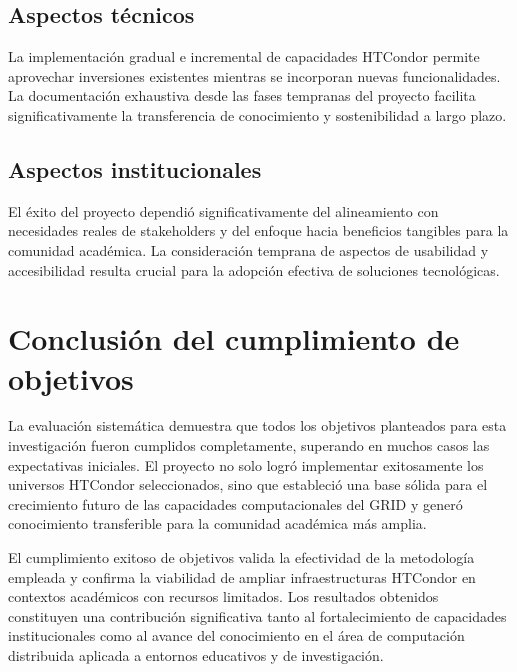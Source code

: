 \subsection{Aspectos técnicos}
\noindent

La implementación gradual e incremental de capacidades HTCondor permite aprovechar inversiones existentes mientras se incorporan nuevas funcionalidades. La documentación exhaustiva desde las fases tempranas del proyecto facilita significativamente la transferencia de conocimiento y sostenibilidad a largo plazo.

\subsection{Aspectos institucionales}
\noindent

El éxito del proyecto dependió significativamente del alineamiento con necesidades reales de stakeholders y del enfoque hacia beneficios tangibles para la comunidad académica. La consideración temprana de aspectos de usabilidad y accesibilidad resulta crucial para la adopción efectiva de soluciones tecnológicas.

\section{Conclusión del cumplimiento de objetivos}
\noindent

La evaluación sistemática demuestra que todos los objetivos planteados para esta investigación fueron cumplidos completamente, superando en muchos casos las expectativas iniciales. El proyecto no solo logró implementar exitosamente los universos HTCondor seleccionados, sino que estableció una base sólida para el crecimiento futuro de las capacidades computacionales del GRID y generó conocimiento transferible para la comunidad académica más amplia.

El cumplimiento exitoso de objetivos valida la efectividad de la metodología empleada y confirma la viabilidad de ampliar infraestructuras HTCondor en contextos académicos con recursos limitados. Los resultados obtenidos constituyen una contribución significativa tanto al fortalecimiento de capacidades institucionales como al avance del conocimiento en el área de computación distribuida aplicada a entornos educativos y de investigación.
